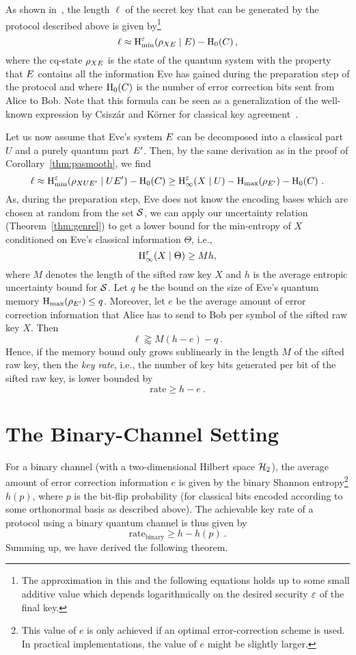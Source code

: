 As shown in~\cite[Lemma~6.4.1]{Renner05}, the length $\ell$ of the
secret key that can be generated by the protocol described above is
given by\footnote{The approximation in this and the following
  equations holds up to some small additive value which depends
  logarithmically on the desired security $\varepsilon$ of the final key.}
\[
\ell \approx \operatorname{H}_{\rm min}^{\varepsilon}(\rho_{X E} \mid E) - \operatorname{H}_{0}(C)  \, ,
\]
where the cq-state $\rho_{X E}$ is the state of the quantum system
with the property that $E$ contains all the information Eve has
gained during the preparation step of the protocol and where
$\operatorname{H}_{0}(C)$ is the number of error correction bits sent from Alice to
Bob. Note that this formula can be seen as a generalization of the
well-known expression by Csisz\'{a}r and K\"{o}rner for classical key
agreement~\cite{CK78}.

Let us now assume that Eve's system $E$ can be decomposed into a
classical part $U$ and a purely quantum part $E'$. Then, by the
same derivation as in the proof of Corollary~\ref{thm:pasmooth}, we find
\[
  \ell 
\approx 
  \operatorname{H}_{\rm min}^{\varepsilon}(\rho_{X U E'} \mid U E') - \operatorname{H}_{0}(C) 
\geq
  \operatorname{H}_{\infty}^{\varepsilon}(X \mid U) - \operatorname{H}_{\rm max}(\rho_{E'}) - \operatorname{H}_{0}(C) \ .
\]
As, during the preparation step, Eve does not know the encoding
bases which are chosen at random from the set $\mathcal{S}$, we can apply our
uncertainty relation (Theorem~\ref{thm:genrel}) to get a lower bound for
the min-entropy of $X$ conditioned on Eve's classical information $\Theta$,
i.e.,
\[
\operatorname{H}_{\infty}^{\varepsilon}(X \mid \Theta) \geq M h,
\]
where $M$ denotes the length of the sifted raw key $X$ and $h$ is the
average entropic uncertainty
bound for $\mathcal{S}$.  Let $q$ be the bound
on the size of Eve's quantum memory $\operatorname{H}_{\rm max}(\rho_{E'}) \leq q$.
Moreover, let $e$ be the average amount of error correction
information that Alice has to send to Bob per symbol of the sifted raw
key $X$. Then
\[
  \ell 
\gtrapprox 
  M (h-e) - q \ .
\]
Hence, if the memory bound only grows sublinearly in the length $M$ of
the sifted raw key, then the \emph{key rate}, i.e., the number of key
bits generated per bit of the sifted raw key, is lower bounded by
\[
  \mathrm{rate}
\geq
  h-e \ .
\]

\section{The Binary-Channel Setting}
For a binary channel (with a two-dimensional Hilbert space $\mathcal{H}_2$), the average
amount of error correction information $e$ is given by the binary Shannon
entropy\footnote{This value of $e$ is only achieved if an optimal
  error-correction scheme is used. In practical implementations, the
  value of $e$ might be slightly larger.} $h(p)$, where $p$ is
the bit-flip probability (for classical bits encoded according to some
orthonormal basis as described above). The achievable key rate of a
\QKD protocol using a binary quantum channel is thus given by
\[
  \mathrm{rate}_{\mathrm{binary}} \geq h - h(p) \ .
\]
Summing up, we have derived the following theorem.

